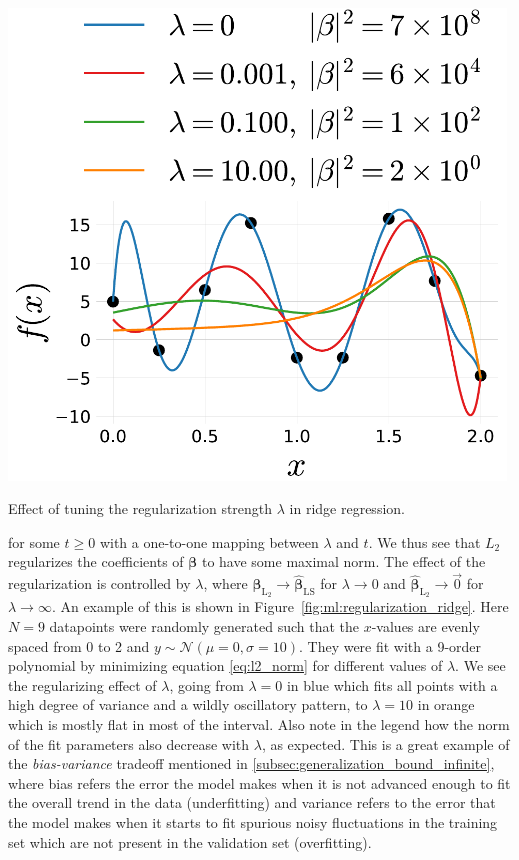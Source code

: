\begin{marginfigure}[5mm]
  \includegraphics[width=0.99\textwidth, trim=5 5 5 5, clip]{figures/ridge_regression/ridge.pdf}
  \caption[Regularization Strength]
    {Effect of tuning the regularization strength $\lambda$ in ridge regression.
    }
  \label{fig:ml:regularization_ridge}
\end{marginfigure}

\noindent for some $t \geq 0$ with a one-to-one mapping between $\lambda$ and $t$. We thus see that $L_2$ regularizes the coefficients of $\bm{\beta}$ to have some maximal norm. The effect of the regularization is controlled by $\lambda$, where $\hat{\bm{\beta}}_{\mathrm{L_2}} \rightarrow \hat{\bm{\beta}}_{\mathrm{LS}}$ for $\lambda \rightarrow 0$ and $\hat{\bm{\beta}}_{\mathrm{L_2}} \rightarrow \vec{0}$ for $\lambda \rightarrow \infty$. An example of this is shown in Figure~\ref{fig:ml:regularization_ridge}. Here $N=9$ datapoints were randomly generated such that the $x$-values are evenly spaced from \num{0} to \num{2} and $y \sim \mathcal{N}(\mu=0, \sigma=10)$. They were fit with a \num{9}-order polynomial by minimizing equation \eqref{eq:l2_norm} for different values of $\lambda$. We see the regularizing effect of $\lambda$, going from $\lambda=0$ in blue which fits all points with a high degree of variance and a wildly oscillatory pattern, to $\lambda=10$ in orange which is mostly flat in most of the interval. Also note in the legend how the norm of the fit parameters also decrease with $\lambda$, as expected. This is a great example of the \emph{bias-variance} tradeoff mentioned in \autoref{subsec:generalization_bound_infinite}, where bias refers the error the model makes when it is not advanced enough to fit the overall trend in the data (underfitting) and variance refers to the error that the model makes when it starts to fit spurious noisy fluctuations in the training set which are not present in the validation set (overfitting). 

